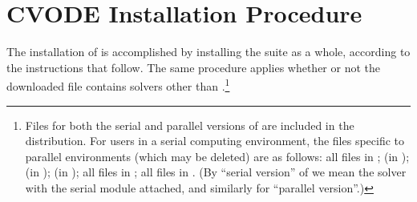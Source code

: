 \chapter{CVODE Installation Procedure}\label{s:install}

The installation of {\cvode} is accomplished by installing the
{\sundials} suite as a whole, according to the instructions that
follow. The same procedure applies whether or not the downloaded
file contains solvers other than {\cvode}.\footnote{Files for both the
serial and parallel versions of {\cvode} are included in the distribution.
For users in a serial computing environment, the files specific to parallel
environments (which may be deleted) are as follows:
all files in ;
 (in );
 (in ); 
 (in );
all files in ;
all files in .
(By ``serial version'' of {\cvode} we mean the {\cvode} solver with the
serial {\nvector} module attached, and similarly for ``parallel version''.)}





